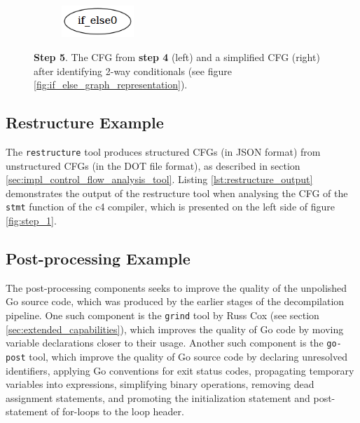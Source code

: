 \begin{figure}[htbp]
\begin{subfigure}[t]{0.45\textwidth}
	\end{subfigure}
	\qquad
	\begin{subfigure}[t]{0.45\textwidth}
		\centering
		\includegraphics[width=0.3\textwidth]{appendices/stmt_example/stmt_5.png}
	\end{subfigure}
	\caption{\textbf{Step 5}. The CFG from \textbf{step 4} (left) and a simplified CFG (right) after identifying 2-way conditionals (see figure \ref{fig:if_else_graph_representation}).}
	\label{fig:step_5}
\end{figure}

\clearpage


\subsection{Restructure Example}
\label{app:restructure_example}

The \texttt{restructure} tool produces structured CFGs (in JSON format) from unstructured CFGs (in the DOT file format), as described in section \ref{sec:impl_control_flow_analysis_tool}. Listing \ref{lst:restructure_output} demonstrates the output of the restructure tool when analysing the CFG of the \texttt{stmt} function of the c4 compiler, which is presented on the left side of figure \ref{fig:step_1}.



\clearpage


\subsection{Post-processing Example}

The post-processing components seeks to improve the quality of the unpolished Go source code, which was produced by the earlier stages of the decompilation pipeline. One such component is the \texttt{grind} tool by Russ Cox (see section \ref{sec:extended_capabilities}), which improves the quality of Go code by moving variable declarations closer to their usage. Another such component is the \texttt{go-post} tool, which improve the quality of Go source code by declaring unresolved identifiers, applying Go conventions for exit status codes, propagating temporary variables into expressions, simplifying binary operations, removing dead assignment statements, and promoting the initialization statement and post-statement of for-loops to the loop header.

